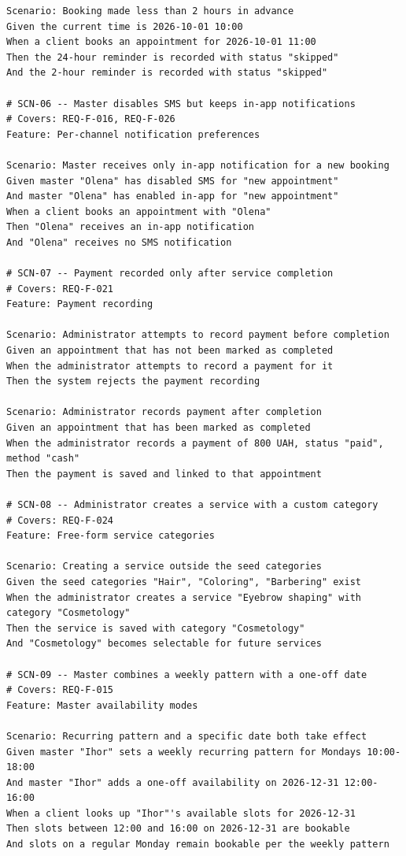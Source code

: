\documentclass[11pt,a4paper]{article}
\begin{document}
\begin{lstlisting}
Scenario: Booking made less than 2 hours in advance
Given the current time is 2026-10-01 10:00
When a client books an appointment for 2026-10-01 11:00
Then the 24-hour reminder is recorded with status "skipped"
And the 2-hour reminder is recorded with status "skipped"

# SCN-06 -- Master disables SMS but keeps in-app notifications
# Covers: REQ-F-016, REQ-F-026
Feature: Per-channel notification preferences

Scenario: Master receives only in-app notification for a new booking
Given master "Olena" has disabled SMS for "new appointment"
And master "Olena" has enabled in-app for "new appointment"
When a client books an appointment with "Olena"
Then "Olena" receives an in-app notification
And "Olena" receives no SMS notification

# SCN-07 -- Payment recorded only after service completion
# Covers: REQ-F-021
Feature: Payment recording

Scenario: Administrator attempts to record payment before completion
Given an appointment that has not been marked as completed
When the administrator attempts to record a payment for it
Then the system rejects the payment recording

Scenario: Administrator records payment after completion
Given an appointment that has been marked as completed
When the administrator records a payment of 800 UAH, status "paid", method "cash"
Then the payment is saved and linked to that appointment

# SCN-08 -- Administrator creates a service with a custom category
# Covers: REQ-F-024
Feature: Free-form service categories

Scenario: Creating a service outside the seed categories
Given the seed categories "Hair", "Coloring", "Barbering" exist
When the administrator creates a service "Eyebrow shaping" with category "Cosmetology"
Then the service is saved with category "Cosmetology"
And "Cosmetology" becomes selectable for future services

# SCN-09 -- Master combines a weekly pattern with a one-off date
# Covers: REQ-F-015
Feature: Master availability modes

Scenario: Recurring pattern and a specific date both take effect
Given master "Ihor" sets a weekly recurring pattern for Mondays 10:00-18:00
And master "Ihor" adds a one-off availability on 2026-12-31 12:00-16:00
When a client looks up "Ihor"'s available slots for 2026-12-31
Then slots between 12:00 and 16:00 on 2026-12-31 are bookable
And slots on a regular Monday remain bookable per the weekly pattern


\end{lstlisting}
\end{document}
